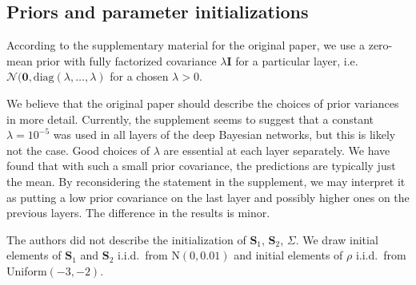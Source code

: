 \subsection{Priors and parameter initializations}\label{subsec:priors-and-parameter-initializations}
According to the supplementary material for the original paper, we use a zero-mean prior with fully factorized covariance $\lambda \mathbf{I}$ for a particular layer, i.e. $\mathcal{N}(\mathbf{0}, \mathrm{diag}(\lambda, \dots, \lambda)$ for a chosen $\lambda > 0$.

We believe that the original paper should describe the choices of prior variances in more detail.
Currently, the supplement seems to suggest that a constant $\lambda = 10^{-5}$ was used in all layers of the deep Bayesian networks, but this is likely not the case.
Good choices of $\lambda$ are essential at each layer separately.
We have found that with such a small prior covariance, the predictions are typically just the mean.
By reconsidering the statement in the supplement, we may interpret it as putting a low prior covariance on the last layer and possibly higher ones on the previous layers.
The difference in the results is minor.

The authors did not describe the initialization of $\mathbf{S}_1$, $\mathbf{S}_2$, $\Sigma$.
We draw initial elements of $\mathbf{S}_1$ and $\mathbf{S}_2$ i.i.d.\ from $\mathrm{N}(0, 0.01)$ and initial elements of $\rho$ i.i.d.\ from Uniform$(-3, -2)$.
